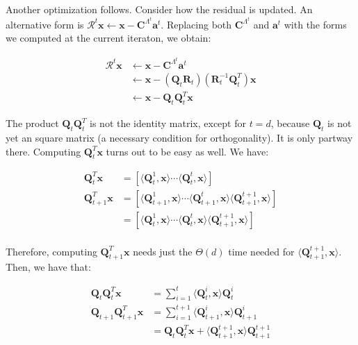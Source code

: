 \documentclass[12pt,a4paper,oneside,english]{UPBThesis}
\begin{document}
Another optimization follows. Consider how the residual is updated. An alternative form is $\mathcal{R}^t\textbf{x} \gets \textbf{x} - \textbf{C}^{\Lambda^t}\textbf{a}^t$. Replacing both $\textbf{C}^{\Lambda^t}$ and $\textbf{a}^t$ with the forms we computed at the current iteraton, we obtain:

\begin{align*}
\mathcal{R}^t\textbf{x} & \gets \textbf{x} - \textbf{C}^{\Lambda^t}\textbf{a}^t \\
& \gets \textbf{x} - (\textbf{Q}_t\textbf{R}_t)(\textbf{R}_t^{-1}\textbf{Q}_t^T)\textbf{x} \\
& \gets \textbf{x} - \textbf{Q}_t\textbf{Q}_t^T\textbf{x}
\end{align*}

The product $\textbf{Q}_t\textbf{Q}_t^T$ is not the identity matrix, except for $t = d$, because $\textbf{Q}_t$ is not yet an square matrix (a necessary condition for orthogonality). It is only partway there. Computing $\textbf{Q}_t^T\textbf{x}$ turns out to be easy as well. We have:

\begin{align*}
\textbf{Q}_t^T\textbf{x} & = [ \langle \textbf{Q}_t^1, \textbf{x} \rangle \cdots \langle \textbf{Q}_t^t, \textbf{x} \rangle ] \\
\textbf{Q}_{t+1}^T\textbf{x} & = [ \langle \textbf{Q}_{t+1}^1, \textbf{x} \rangle \cdots \langle \textbf{Q}_{t+1}^t, \textbf{x} \rangle \langle \textbf{Q}_{t+1}^{t+1}, \textbf{x} \rangle ] \\
& = [ \langle \textbf{Q}_t^1, \textbf{x} \rangle \cdots \langle \textbf{Q}_t^t, \textbf{x} \rangle \langle \textbf{Q}_{t+1}^{t+1}, \textbf{x} \rangle] \\
\end{align*}

Therefore, computing $\textbf{Q}_{t+1}^T\textbf{x}$ needs just the $\Theta(d)$ time needed for $\langle \textbf{Q}_{t+1}^{t+1}, \textbf{x} \rangle$. Then, we have that:

\begin{align*}
\textbf{Q}_t\textbf{Q}_t^T\textbf{x} & = \sum_{i=1}^t {\langle \textbf{Q}_t^i, \textbf{x} \rangle \textbf{Q}_t^i} \\
\textbf{Q}_{t+1}\textbf{Q}_{t+1}^T\textbf{x} & = \sum_{i=1}^{t+1} {\langle \textbf{Q}_{t+1}^i, \textbf{x} \rangle \textbf{Q}_{t+1}^i} \\
& = \textbf{Q}_t\textbf{Q}_t^T\textbf{x} + \langle \textbf{Q}_{t+1}^{t+1}, \textbf{x} \rangle \textbf{Q}_{t+1}^{t+1}
\end{align*}
\end{document}
